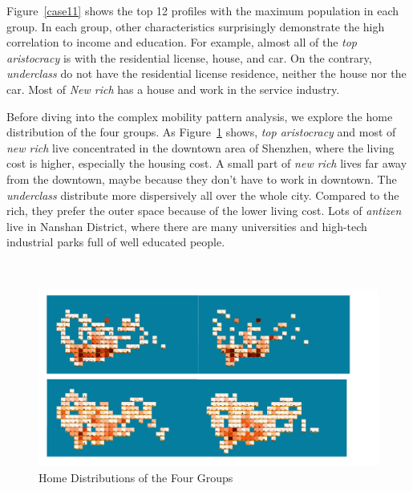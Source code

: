 Figure~\ref{case11} shows the top 12 profiles with the maximum population in each group. In each group, other characteristics surprisingly demonstrate the high correlation to income and education. For example, almost all of the \textit{top aristocracy} is with the residential license,  house, and car. On the contrary, \textit{underclass} do not have the residential license residence, neither the house nor the car. Most of \textit{New rich} has a house and work in the service industry.

Before diving into the complex mobility pattern analysis, we explore the home distribution of the four groups. As Figure~\ref{case1draft} shows, \textit{top aristocracy} and most of \textit{new rich} live concentrated in the downtown area of Shenzhen, where the living cost is higher, especially the housing cost. A small part of \textit{new rich} lives far away from the downtown, maybe because they don't have to work in downtown. The \textit{underclass} distribute more dispersively all over the whole city. Compared to the rich, they prefer the outer space because of the lower living cost. Lots of \textit{antizen} live in Nanshan District, where there are many universities and high-tech industrial parks full of well educated people.

\\

\begin{figure}[htb!]
 \centering %
 \includegraphics[width=\columnwidth]{pictures/c1-s3-53}
 \caption{Home Distributions of the Four Groups}
 \label{case1draft}
\end{figure}


